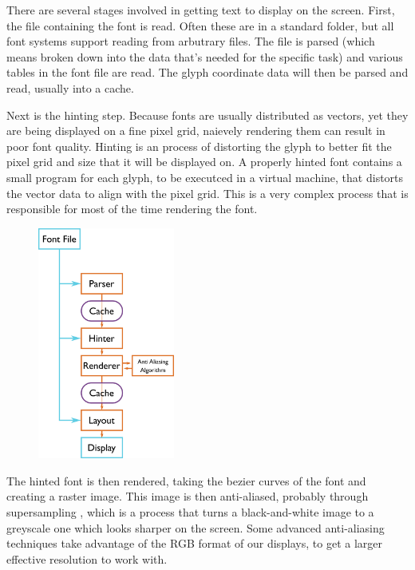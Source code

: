 \documentclass{report}
\begin{document}
There are several stages involved in getting text to display on the screen.
First, the file containing the font is read. Often these are in a standard
folder, but all font systems support reading from arbutrary files. The file is
parsed (which means broken down into the data that's needed for the specific
task) and various tables in the font file are read. The glyph coordinate data
will then be parsed and read, usually into a cache.

Next is the hinting step. Because fonts are usually distributed as vectors, yet
they are being displayed on a fine pixel grid, naievely rendering them can
result in poor font quality. Hinting is an process of distorting the glyph to
better fit the pixel grid and size that it will be displayed on. A properly
hinted font contains a small program for each glyph, to be executced in a
virtual machine, that distorts the vector data to align with the pixel grid.
This is a very complex process that is responsible for most of the time
rendering the font.
\begin{figure}
  \centering
  \includegraphics[width=0.4\textwidth]{fontpipelineimg}
\end{figure}

The hinted font is then rendered, taking the bezier curves of the font and
creating a raster image. This image is then anti-aliased, probably through
supersampling , which is a process that turns a
black-and-white image to a greyscale one which looks sharper on the screen. Some
advanced anti-aliasing techniques take advantage of the RGB format of our
displays, to get a larger effective resolution to work with.
\end{document}

